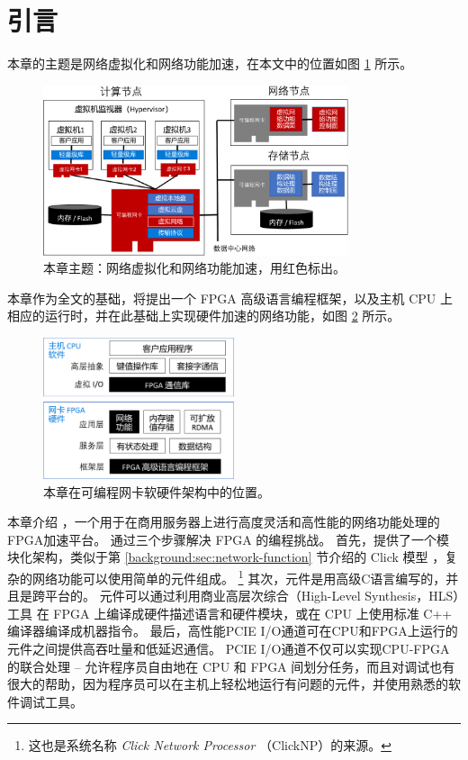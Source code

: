 \section{引言}

本章的主题是网络虚拟化和网络功能加速，在本文中的位置如图 \ref{clicknp:fig:sys-arch} 所示。

\begin{figure}[htbp]
	\centering
	\includegraphics[width=0.8\textwidth]{image/sys_arch.pdf}
	\caption{本章主题：网络虚拟化和网络功能加速，用红色标出。}
	\label{clicknp:fig:sys-arch}
\end{figure}

本章作为全文的基础，将提出一个 FPGA 高级语言编程框架，以及主机 CPU 上相应的运行时，并在此基础上实现硬件加速的网络功能，如图 \ref{clicknp:fig:sw-hw-codesign} 所示。

\begin{figure}[htbp]
	\centering
	\includegraphics[width=0.5\textwidth]{image/sw_hw_codesign.pdf}
	\caption{本章在可编程网卡软硬件架构中的位置。}
	\label{clicknp:fig:sw-hw-codesign}
\end{figure}

本章介绍 \name{}，一个用于在商用服务器上进行高度灵活和高性能的网络功能处理的FPGA加速平台。
\name{} 通过三个步骤解决 FPGA 的编程挑战。
首先，提供了一个模块化架构，类似于第 \ref{background:sec:network-function} 节介绍的 Click 模型 \cite {kohler2000click}，复杂的网络功能可以使用简单的元件组成。
\footnote{这也是系统名称 \textit{Click Network Processor} （ClickNP）的来源。}
其次，\name 元件是用高级C语言编写的，并且是跨平台的。
\name 元件可以通过利用商业高层次综合（High-Level Synthesis，HLS）工具 \cite {vivado,aoc,sdaccel} 在 FPGA 上编译成硬件描述语言和硬件模块，或在 CPU 上使用标准 C++ 编译器编译成机器指令。
最后，高性能PCIE I/O通道可在CPU和FPGA上运行的元件之间提供高吞吐量和低延迟通信。
PCIE I/O通道不仅可以实现CPU-FPGA的联合处理 -- 允许程序员自由地在 CPU 和 FPGA 间划分任务，而且对调试也有很大的帮助，因为程序员可以在主机上轻松地运行有问题的元件，并使用熟悉的软件调试工具。

